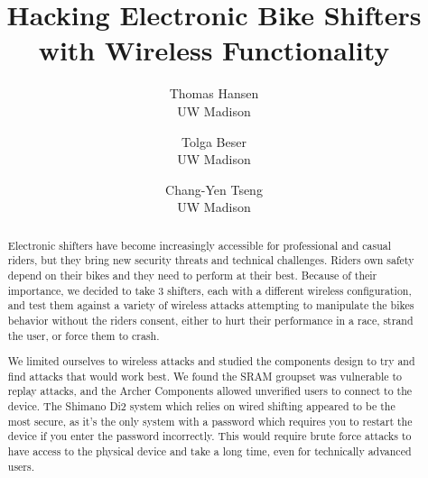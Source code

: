 \documentclass[letterpaper,twocolumn,10pt]{article}
\begin{document}
\date{}

\title{\Large \bf Hacking Electronic Bike Shifters with Wireless Functionality }

\author{
  {\rm Thomas Hansen}\\
  UW Madison
  \and
  {\rm Tolga Beser}\\
  UW Madison
  \and
  {\rm Chang-Yen Tseng}\\
  UW Madison
} %

\maketitle

\thispagestyle{empty}


\begin{abstract}
  Electronic shifters have become increasingly accessible for professional and casual riders, but they bring new security threats and technical challenges. Riders own safety depend on their bikes and they need to perform at their best. Because of their importance, we decided to take 3 shifters, each with a different wireless configuration, and test them against a variety of wireless attacks attempting to manipulate the bikes behavior without the riders consent, either to hurt their performance in a race, strand the user, or force them to crash.

  We limited ourselves to wireless attacks and studied the components design to try and find attacks that would work best. We found the SRAM groupset was vulnerable to replay attacks, and the Archer Components allowed unverified users to connect to the device. The Shimano Di2 system which relies on wired shifting appeared to be the most secure, as it's the only system with a password which requires you to restart the device if you enter the password incorrectly. This would require brute force attacks to have access to the physical device and take a long time, even for technically advanced users.
\end{abstract}
\end{document}
